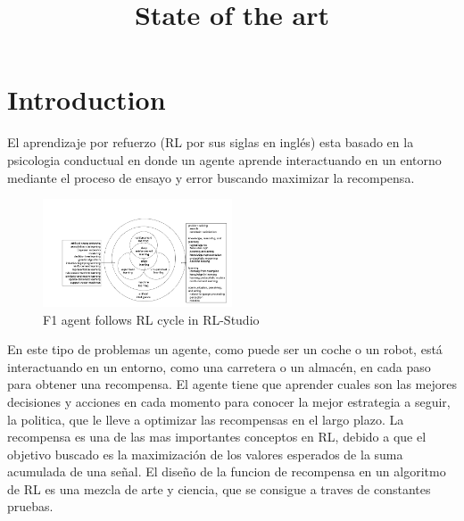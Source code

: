 \documentclass{svproc}
\begin{document}
\title{State of the art}
\maketitle
\tableofcontents
\listoffigures


\section{Introduction}\label{ch:intro}
El aprendizaje por refuerzo (RL por sus siglas en inglés) esta basado en la psicologia conductual en donde un agente aprende interactuando en un entorno mediante el proceso de ensayo y error buscando maximizar la recompensa. 

\begin{figure}[ht]
    \centering
    \includegraphics[width=0.5\textwidth]{figures/AI.png}
    \caption{F1 agent follows RL cycle in RL-Studio}
    \label{fig:AI components}
\end{figure}

En este tipo de problemas un agente, como puede ser un coche o un robot, está interactuando en un entorno, como una carretera o un almacén, en cada paso para obtener una recompensa. El agente tiene que aprender cuales son las mejores decisiones y acciones en cada momento para conocer la mejor estrategia a seguir, la politica, que le lleve a optimizar las recompensas en el largo plazo. La recompensa es una de las mas importantes conceptos en RL, debido a que el objetivo buscado es la maximización de los valores esperados de la suma acumulada de una señal. El diseño de la funcion de recompensa en un algoritmo de RL es una mezcla de arte y ciencia, que se consigue a traves de constantes pruebas.
\end{document}
